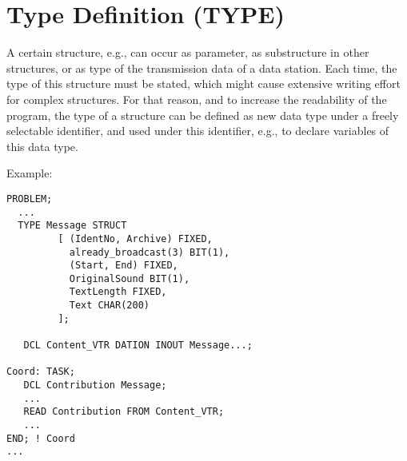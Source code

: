 \section{Type Definition (TYPE)} %
\label{sec_type}

A certain structure, e.g., can occur as parameter, as substructure in other
structures, or as type of the transmission data of a data station.  Each
time, the type of this structure must be stated, which might cause
extensive writing effort for complex structures. For that reason, and to
increase the readability of the program, the type of a structure can be
defined as new data type under a freely selectable identifier, and used
under this identifier, e.g., to declare variables of this data type.

Example:
\begin{lstlisting}
PROBLEM;
  ...
  TYPE Message STRUCT
         [ (IdentNo, Archive) FIXED,
           already_broadcast(3) BIT(1),
           (Start, End) FIXED,
           OriginalSound BIT(1),
           TextLength FIXED,
           Text CHAR(200)
         ];
          
   DCL Content_VTR DATION INOUT Message...;
          
Coord: TASK;
   DCL Contribution Message;
   ...
   READ Contribution FROM Content_VTR;
   ...
END; ! Coord
...     
\end{lstlisting}

